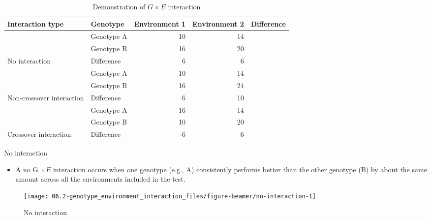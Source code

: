 \documentclass[11pt,dvipsnames,ignorenonframetext,aspectratio=169]{beamer}
\providecommand{\tightlist}{%
  \setlength{\itemsep}{0pt}\setlength{\parskip}{0pt}}
\begin{document}
\begin{frame}{}
\protect\hypertarget{section-3}{}
\begin{table}

\caption{\label{tab:unnamed-chunk-1}Demonstration of $G \times E$ interaction}
\centering
\begin{tabular}[t]{llrrl}
\toprule
Interaction type & Genotype & Environment 1 & Environment 2 & Difference\\
\midrule
 & Genotype A & 10 & 14 & \\

 & Genotype B & 16 & 20 & \\

\multirow[t]{-3}{*}{\raggedright\arraybackslash No interaction} & Difference & 6 & 6 & \\
\cmidrule{1-5}
 & Genotype A & 10 & 14 & \\

 & Genotype B & 16 & 24 & \\

\multirow[t]{-3}{*}{\raggedright\arraybackslash Non-crossover interaction} & Difference & 6 & 10 & \\
\cmidrule{1-5}
 & Genotype A & 16 & 14 & \\

 & Genotype B & 10 & 20 & \\

\multirow[t]{-3}{*}{\raggedright\arraybackslash Crossover interaction} & Difference & -6 & 6 & \\
\bottomrule
\end{tabular}
\end{table}
\end{frame}

\begin{frame}{No interaction}
\protect\hypertarget{no-interaction}{}
\begin{itemize}
\tightlist
\item
  A no G \(\times E\) interaction occurs when one genotype (e.g., A)
  consistently performs better than the other genotype (B) by about the
  same amount across all the environments included in the test.
\end{itemize}

\begin{figure}
\texttt{[image: 06.2-genotype\_environment\_interaction\_files/figure-beamer/no-interaction-1]} \caption{No interaction}\label{fig:no-interaction}
\end{figure}
\end{frame}
\end{document}
